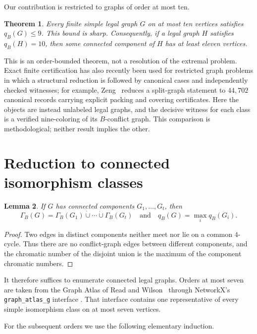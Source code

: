 \documentclass[11pt]{article}
\newtheorem{theorem}{Theorem}
\newtheorem{lemma}[theorem]{Lemma}
\newcommand{\GB}{\Gamma_{B}}
\newcommand{\qB}{q_{B}}
\begin{document}
Our contribution is restricted to graphs of order at most ten.

\begin{theorem}\label{thm:main}
Every finite simple legal graph $G$ on at most ten vertices satisfies
$\qB(G)\leq 9$.  This bound is sharp.  Consequently, if a legal graph $H$
satisfies $\qB(H)=10$, then some connected component of $H$ has at least
eleven vertices.
\end{theorem}

This is an order-bounded theorem, not a resolution of the extremal problem.
Exact finite certification has also recently been used for restricted graph
problems in which a structural reduction is followed by canonical cases and
independently checked witnesses; for example, Zeng~\cite{Zeng2026Tuza}
reduces a split-graph statement to $44{,}702$ canonical records carrying
explicit packing and covering certificates.  Here the objects are instead
unlabeled legal graphs, and the decisive witness for each class is a verified
nine-coloring of its $B$-conflict graph.  This comparison is methodological;
neither result implies the other.

\section{Reduction to connected isomorphism classes}

\begin{lemma}\label{lem:components}
If $G$ has connected components $G_1,\dots,G_t$, then
\[
  \GB(G)=\GB(G_1)\mathbin{\dot\cup}\cdots\mathbin{\dot\cup}\GB(G_t)
  \quad\text{and}\quad
  \qB(G)=\max_i\qB(G_i).
\]
\end{lemma}

\begin{proof}
Two edges in distinct components neither meet nor lie on a common $4$-cycle.
Thus there are no conflict-graph edges between different components, and the
chromatic number of the disjoint union is the maximum of the component
chromatic numbers.
\end{proof}

It therefore suffices to enumerate connected legal graphs.  Orders at most
seven are taken from the Graph Atlas of Read and Wilson~\cite{ReadWilson1998}
through NetworkX's \texttt{graph\_atlas\_g} interface
\cite{HagbergSchultSwart2008}.  That interface contains one representative
of every simple isomorphism class on at most seven vertices.

For the subsequent orders we use the following elementary induction.
\end{document}
